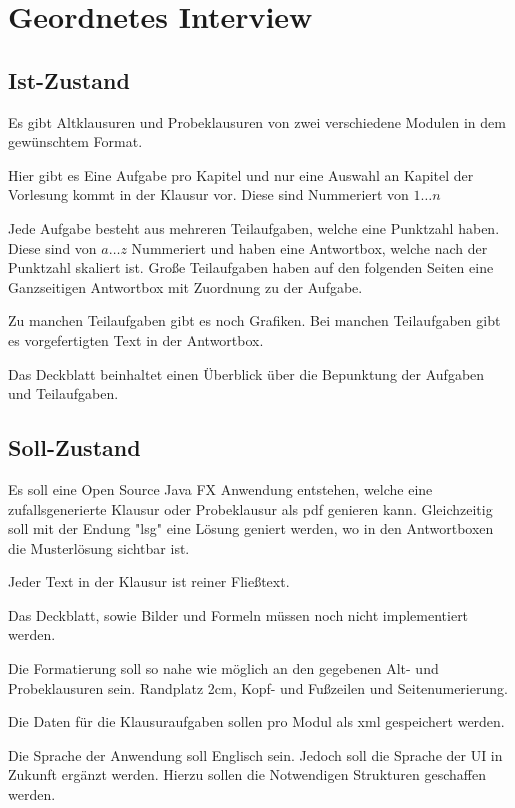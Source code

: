 \documentclass[a4paper]{article}
\begin{document}
\section{Geordnetes Interview}

\subsection{Ist-Zustand}

Es gibt Altklausuren und Probeklausuren von zwei verschiedene Modulen in dem gewünschtem Format.

Hier gibt es Eine Aufgabe pro Kapitel und nur eine Auswahl an Kapitel der Vorlesung kommt in der Klausur vor. Diese sind Nummeriert von $1\dots n$

Jede Aufgabe besteht aus mehreren Teilaufgaben, welche eine Punktzahl haben. Diese sind von $a\dots z$ Nummeriert und haben eine Antwortbox, welche nach der Punktzahl skaliert ist. Große Teilaufgaben haben auf den folgenden Seiten eine Ganzseitigen Antwortbox mit Zuordnung zu der Aufgabe.

Zu manchen Teilaufgaben gibt es noch Grafiken. Bei manchen Teilaufgaben gibt es vorgefertigten Text in der Antwortbox.

Das Deckblatt beinhaltet einen Überblick über die Bepunktung der Aufgaben und Teilaufgaben. 

\subsection{Soll-Zustand}

Es soll eine Open Source Java FX Anwendung entstehen, welche eine zufallsgenerierte Klausur oder Probeklausur als pdf genieren kann. Gleichzeitig soll mit der Endung "lsg" eine Lösung geniert werden, wo in den Antwortboxen die Musterlösung sichtbar ist.

Jeder Text in der Klausur ist reiner Fließtext.

Das Deckblatt, sowie Bilder und Formeln müssen noch nicht implementiert werden.

Die Formatierung soll so nahe wie möglich an den gegebenen Alt- und Probeklausuren sein. Randplatz 2cm, Kopf- und Fußzeilen und Seitenumerierung.

Die Daten für die Klausuraufgaben sollen pro Modul als xml gespeichert werden.

Die Sprache der Anwendung soll Englisch sein. Jedoch soll die Sprache der UI in Zukunft ergänzt werden. Hierzu sollen die Notwendigen Strukturen geschaffen werden.
\end{document}
